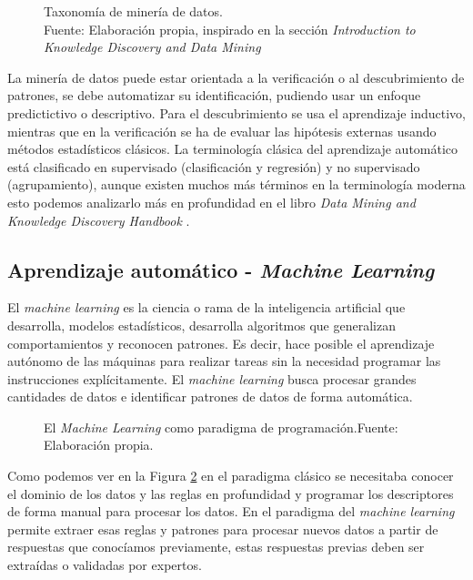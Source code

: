 \begin{figure}[H]
    \centering
    \centerline{}
    \caption{Taxonomía de minería de datos.\\Fuente: Elaboración propia, inspirado en la sección \textit{Introduction to Knowledge Discovery and Data Mining} \cite{maimon2005data}}
    \label{fig:data-mining-taxonomy}
\end{figure}

La minería de datos puede estar orientada a la verificación o al descubrimiento de patrones, se debe automatizar su identificación, pudiendo usar un enfoque predictictivo o descriptivo. Para el descubrimiento se usa el aprendizaje inductivo, mientras que en la verificación se ha de evaluar las hipótesis externas usando métodos estadísticos clásicos. La terminología clásica del aprendizaje automático está clasificado en supervisado (clasificación y regresión) y no supervisado (agrupamiento), aunque existen muchos más términos en la terminología moderna esto podemos analizarlo más en profundidad en el libro \textit{Data Mining and Knowledge Discovery Handbook} \cite{maimon2005data}.


\subsection{Aprendizaje automático - \textit{Machine Learning}}

El \textit{machine learning} es la ciencia o rama de la inteligencia artificial que desarrolla, modelos estadísticos, desarrolla algoritmos que generalizan comportamientos y reconocen patrones. Es decir, hace posible el aprendizaje autónomo de las máquinas para realizar tareas sin la necesidad programar las instrucciones explícitamente. El \textit{machine learning} busca procesar grandes cantidades de datos e identificar patrones de datos de forma automática.

\begin{figure}[H]
    \centering
    \centerline{}
    \caption{El \textit{Machine Learning} como paradigma de programación.\newline{}Fuente: Elaboración propia.}
    \label{fig:machine-learning-rules}
\end{figure}

Como podemos ver en la Figura \ref{fig:machine-learning-rules} en el paradigma clásico se necesitaba conocer el dominio de los datos y las reglas en profundidad y programar los descriptores de forma manual para procesar los datos. En el paradigma del \textit{machine learning} permite extraer esas reglas y patrones para procesar nuevos datos a partir de respuestas que conocíamos previamente, estas respuestas previas deben ser extraídas o validadas por expertos.

